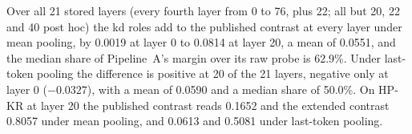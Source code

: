 Over all 21 stored layers (every fourth layer from 0 to 76, plus 22; all but 20, 22 and 40 post hoc) the kd roles add to the published contrast at every layer under mean pooling, by 0.0019 at layer 0 to 0.0814 at layer 20, a mean of 0.0551, and the median share of Pipeline~A's margin over its raw probe is 62.9\%. %
Under last-token pooling the difference is positive at 20 of the 21 layers, negative only at layer 0 ($-0.0327$), with a mean of 0.0590 and a median share of 50.0\%. %
On HP-KR at layer 20 the published contrast reads 0.1652 and the extended contrast 0.8057 under mean pooling, and 0.0613 and 0.5081 under last-token pooling. %

